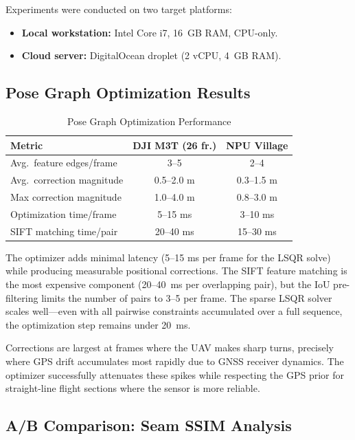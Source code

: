 \documentclass[conference]{IEEEtran}
\begin{document}
Experiments were conducted on two target platforms:
\begin{itemize}
    \item \textbf{Local workstation:} Intel Core i7, 16~GB RAM, CPU-only.
    \item \textbf{Cloud server:} DigitalOcean droplet (2 vCPU, 4~GB RAM).
\end{itemize}

\subsection{Pose Graph Optimization Results}

\begin{table}[h]
\centering
\caption{Pose Graph Optimization Performance}
\label{tab:posegraph_results}
\begin{tabular}{lcc}
\toprule
\textbf{Metric} & \textbf{DJI M3T (26 fr.)} & \textbf{NPU Village} \\
\midrule
Avg.\ feature edges/frame & 3--5 & 2--4 \\
Avg.\ correction magnitude & 0.5--2.0 m & 0.3--1.5 m \\
Max correction magnitude & 1.0--4.0 m & 0.8--3.0 m \\
Optimization time/frame & 5--15 ms & 3--10 ms \\
SIFT matching time/pair & 20--40 ms & 15--30 ms \\
\bottomrule
\end{tabular}
\end{table}

The optimizer adds minimal latency (5--15 ms per frame for the LSQR solve) while producing measurable positional corrections. The SIFT feature matching is the most expensive component (20--40~ms per overlapping pair), but the IoU pre-filtering limits the number of pairs to 3--5 per frame. The sparse LSQR solver scales well---even with all pairwise constraints accumulated over a full sequence, the optimization step remains under 20~ms.

Corrections are largest at frames where the UAV makes sharp turns, precisely where GPS drift accumulates most rapidly due to GNSS receiver dynamics. The optimizer successfully attenuates these spikes while respecting the GPS prior for straight-line flight sections where the sensor is more reliable.

\subsection{A/B Comparison: Seam SSIM Analysis}
\end{document}
